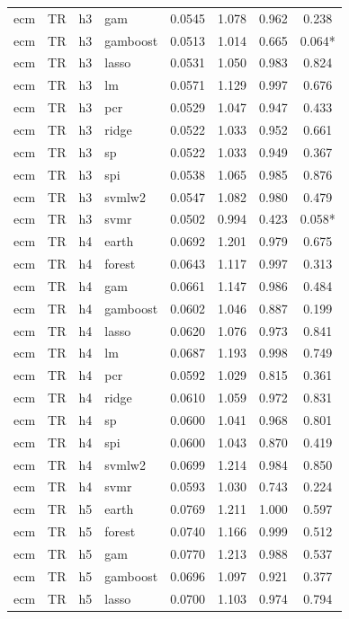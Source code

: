 \begin{ThreePartTable}
\begin{longtable}[t]{llclcccc}
ecm & TR & h3 & gam & 0.0545 & 1.078 & 0.962 & 0.238\\
ecm & TR & h3 & gamboost & 0.0513 & 1.014 & 0.665 & 0.064*\\
ecm & TR & h3 & lasso & 0.0531 & 1.050 & 0.983 & 0.824\\
ecm & TR & h3 & lm & 0.0571 & 1.129 & 0.997 & 0.676\\
ecm & TR & h3 & pcr & 0.0529 & 1.047 & 0.947 & 0.433\\
ecm & TR & h3 & ridge & 0.0522 & 1.033 & 0.952 & 0.661\\
ecm & TR & h3 & sp & 0.0522 & 1.033 & 0.949 & 0.367\\
ecm & TR & h3 & spi & 0.0538 & 1.065 & 0.985 & 0.876\\
ecm & TR & h3 & svmlw2 & 0.0547 & 1.082 & 0.980 & 0.479\\
ecm & TR & h3 & svmr & 0.0502 & 0.994 & 0.423 & 0.058*\\
\addlinespace
ecm & TR & h4 & earth & 0.0692 & 1.201 & 0.979 & 0.675\\
ecm & TR & h4 & forest & 0.0643 & 1.117 & 0.997 & 0.313\\
ecm & TR & h4 & gam & 0.0661 & 1.147 & 0.986 & 0.484\\
ecm & TR & h4 & gamboost & 0.0602 & 1.046 & 0.887 & 0.199\\
ecm & TR & h4 & lasso & 0.0620 & 1.076 & 0.973 & 0.841\\
ecm & TR & h4 & lm & 0.0687 & 1.193 & 0.998 & 0.749\\
ecm & TR & h4 & pcr & 0.0592 & 1.029 & 0.815 & 0.361\\
ecm & TR & h4 & ridge & 0.0610 & 1.059 & 0.972 & 0.831\\
ecm & TR & h4 & sp & 0.0600 & 1.041 & 0.968 & 0.801\\
ecm & TR & h4 & spi & 0.0600 & 1.043 & 0.870 & 0.419\\
ecm & TR & h4 & svmlw2 & 0.0699 & 1.214 & 0.984 & 0.850\\
ecm & TR & h4 & svmr & 0.0593 & 1.030 & 0.743 & 0.224\\
\addlinespace
ecm & TR & h5 & earth & 0.0769 & 1.211 & 1.000 & 0.597\\
ecm & TR & h5 & forest & 0.0740 & 1.166 & 0.999 & 0.512\\
ecm & TR & h5 & gam & 0.0770 & 1.213 & 0.988 & 0.537\\
ecm & TR & h5 & gamboost & 0.0696 & 1.097 & 0.921 & 0.377\\
ecm & TR & h5 & lasso & 0.0700 & 1.103 & 0.974 & 0.794\\

\end{longtable}
\end{ThreePartTable}
